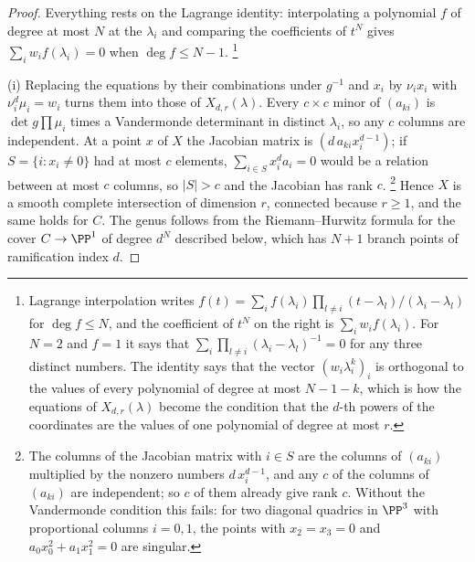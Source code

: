 \begin{proof}
Everything rests on the Lagrange identity: interpolating a polynomial $f$
of degree at most $N$ at the $\lambda_{i}$ and comparing the coefficients of
$t^{N}$ gives $\sum_{i}w_{i}f(\lambda_{i})=0$ when $\deg f\le N-1$.%
\footnote{Lagrange interpolation writes
$f(t)=\sum_{i}f(\lambda_{i})\prod_{l\ne i}(t-\lambda_{l})/(\lambda_{i}-\lambda_{l})$
for $\deg f\le N$, and the coefficient of $t^{N}$ on the right is
$\sum_{i}w_{i}f(\lambda_{i})$. For $N=2$ and $f=1$ it says that
$\sum_{i}\prod_{l\ne i}(\lambda_{i}-\lambda_{l})^{-1}=0$ for any three
distinct numbers. The
identity says that the vector $(w_{i}\lambda_{i}^{k})_{i}$ is orthogonal to the
values of every polynomial of degree at most $N-1-k$, which is how the
equations of $X_{d,r}(\lambda)$ become the condition that the $d$-th powers of
the coordinates are the values of one polynomial of degree at most $r$.}

(i) Replacing the equations by their combinations under $g^{-1}$ and $x_{i}$
by $\nu_{i}x_{i}$ with $\nu_{i}^{d}\mu_{i}=w_{i}$ turns them into those of
$X_{d,r}(\lambda)$. Every $c\times c$ minor of $(a_{ki})$ is
$\det g\prod\mu_{i}$ times a Vandermonde determinant in distinct
$\lambda_{i}$, so any $c$ columns are independent. At a point $x$ of $X$ the
Jacobian matrix is $(d\,a_{ki}x_{i}^{d-1})$; if $S=\{i:x_{i}\ne0\}$ had at most
$c$ elements, $\sum_{i\in S}x_{i}^{d}a_{i}=0$ would be a relation between at
most $c$ columns, so $|S|>c$ and the Jacobian has rank $c$.%
\footnote{The columns of the Jacobian matrix with $i\in S$ are the columns of
$(a_{ki})$ multiplied by the nonzero numbers $d\,x_{i}^{d-1}$, and any $c$ of
the columns of $(a_{ki})$ are independent; so $c$ of them already give rank
$c$. Without the Vandermonde condition this fails: for two diagonal
quadrics in $\PP^{3}$ with proportional columns $i=0,1$, the points with
$x_{2}=x_{3}=0$ and $a_{0}x_{0}^{2}+a_{1}x_{1}^{2}=0$ are singular.} Hence $X$ is a
smooth complete intersection of dimension $r$, connected because $r\ge1$, and
the same holds for $C$. The genus follows from the Riemann--Hurwitz formula
for the cover $C\to\PP^{1}$ of degree $d^{N}$ described below, which has
$N+1$ branch points of ramification index $d$.


\end{proof}
